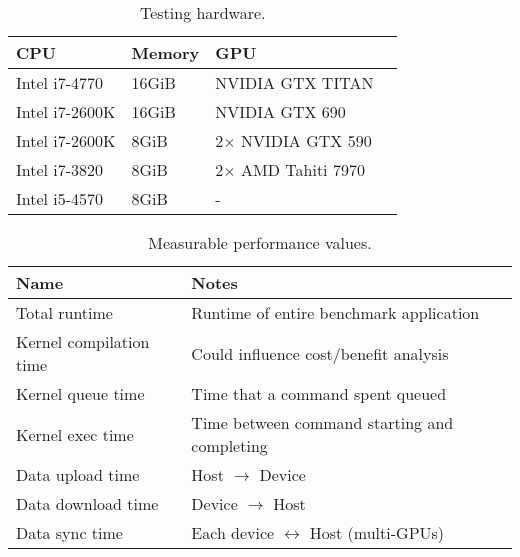 \begin{table}
\footnotesize
\centering
\begin{tabular}{| l | l | l | l |}
\hline
\textbf{CPU} & \textbf{Memory} & \textbf{GPU}\\
\hline
Intel i7-4770 & 16GiB & NVIDIA GTX TITAN\\
Intel i7-2600K & 16GiB & NVIDIA GTX 690\\
Intel i7-2600K & 8GiB & 2$\times$ NVIDIA GTX 590\\
Intel i7-3820 & 8GiB & 2$\times$ AMD Tahiti 7970\\
Intel i5-4570 & 8GiB & -\\
\hline
\end{tabular}
\caption{Testing hardware.}
\label{tab:hw}
\end{table}

\begin{table}
\footnotesize
\centering
\begin{tabular}{| l | l |}
  \hline
  \textbf{Name} & \textbf{Notes}\\
  \hline
  Total runtime & Runtime of entire benchmark application\\
  Kernel compilation time & Could influence cost/benefit analysis\\
  Kernel queue time & Time that a command spent queued\\
  Kernel exec time & Time between command starting and completing\\
  Data upload time & Host $\rightarrow$ Device\\
  Data download time & Device $\rightarrow$ Host\\
  Data sync time & Each device $\leftrightarrow$ Host (multi-GPUs)\\
  \hline
\end{tabular}
\caption{Measurable performance values.}
\label{tab:metric}
\end{table}

